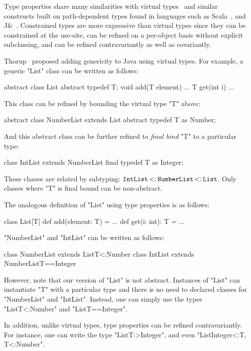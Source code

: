 \documentclass[preprint,nocopyrightspace,9pt]{sigplanconf}
\begin{document}
Type properties share many similarities with virtual
types~\cite{mp89-virtual-classes,beta,ernst99-gbeta,ernst06-virtual,cdnw07-tribe}
and similar constructs built on path-dependent types found in
languages such as Scala~\cite{scala}, and J\&~\cite{nqm06}.
%
Constrained types are more expressive than virtual
types since they can be constrained at the use-site,
can be refined on a per-object basis without explicit subclassing,
and can be refined contravariantly
as well as covariantly. 

Thorup~\cite{thorup97}
proposed adding genericity to Java using virtual types.  For example,
a generic \xcd"List" class can be written as follows:
\begin{xten}
abstract class List {
    abstract typedef T;
    void add(T element) { ... }
    T get(int i) { ... }
}
\end{xten}
This class can be refined by bounding the virtual type \xcd"T" above:
\begin{xten}
abstract class NumberList extends List {
    abstract typedef T as Number;
}
\end{xten}
And this abstract class can be further refined to \emph{final bind}
\xcd"T" to a particular type:
\begin{xten}
class IntList extends NumberList {
    final typedef T as Integer;
}
\end{xten}
These classes are related by subtyping:
${\tt IntList} \subtype {\tt NumberList} \subtype {\tt List}$.
Only classes where \xcd"T" is final bound can be non-abstract.

The analogous definition of 
\xcd"List" using type properties is as follows:
\begin{xten}
class List[T] {
    def add(element: T) = { ... }
    def get(i: int): T = { ... }
}
\end{xten}

\noindent
\xcd"NumberList" and \xcd"IntList" can be written as follows:
\begin{xten}
class NumberList extends List{T<:Number} { }
class IntList extends NumberList{T==Integer} { }
\end{xten}

However, note that our version of \xcd"List" is not abstract.
Instances of \xcd"List"
can instantiate \xcd"T" with a particular type and there is no
need to declared classes for \xcd"NumberList" and \xcd"IntList".
Instead, one can simply use the types
\xcd"List{T<:Number}" and \xcd"List{T==Integer}".

In addition,
unlike virtual types, type properties can be refined contravariantly.
For instance, one can write the type \xcd"List{T:>Integer}",
and even \xcd"List{Integer<:T, T<:Number}".
\end{document}
